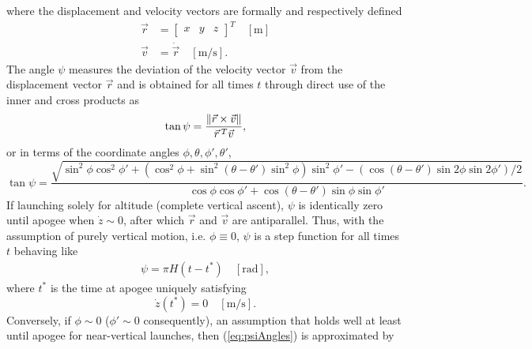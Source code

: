 \documentclass[11pt]{thesis}
\numberwithin{equation}{section}
\begin{document}
where the displacement and velocity vectors are formally and respectively defined
\begin{align}
\vec{r} &= \begin{bmatrix}x & y & z\end{bmatrix}^T \quad [\si{\m}] \\
\vec{v} &= \dot{\vec{r}} \quad [\si{\m/\s}].
\end{align}
The angle $\psi$ measures the deviation of the velocity vector $\vec{v}$ from the displacement vector $\vec{r}$ and is obtained for all times $t$ through direct use of the inner and cross products as
\begin{equation}
\tan\psi = \frac{\norm{\vec{r} \times \vec{v}}}{\vec{r}\,^T \vec{v}}, \label{eq:psirv}
\end{equation}	
or in terms of the coordinate angles $\phi, \theta, \phi', \theta'$,
\begin{equation}
\tan\psi = \frac{\sqrt{\sin^2 \phi \cos^2\phi' + (\cos^2 \phi + \sin^2(\theta - \theta') \sin^2\phi)\sin^2\phi' - (\cos(\theta - \theta') \sin 2\phi \sin 2\phi') / 2}}{\cos\phi \cos\phi' + \cos(\theta - \theta')\sin\phi \sin\phi'}. \label{eq:psiAngles}
\end{equation}
If launching solely for altitude (complete vertical ascent), $\psi$ is identically zero until apogee when $\dot{z} \sim 0$, after which $\vec{r}$ and $\vec{v}$ are antiparallel. Thus, with the assumption of purely vertical motion, i.e. $\phi \equiv 0$, $\psi$ is a step function for all times $t$ behaving like
\begin{align}
\psi = \pi H(t - t^*) \quad [\si{\radian}], \label{eq:psi4vertical}
\end{align}
where $t^*$ is the time at apogee uniquely satisfying
\begin{equation}
\dot{z}(t^*) = 0 \quad [\si{\m/\s}].
\end{equation}
Conversely, if $\phi \sim 0$ ($\phi' \sim 0$ consequently), an assumption that holds well at least until apogee for near-vertical launches, then (\ref{eq:psiAngles}) is approximated by
\end{document}
